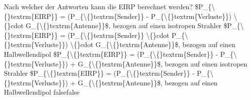     {Nach welcher der Antworten kann die EIRP berechnet werden?}
    {\$P\_\{\textbackslash\{\}textrm\{EIRP\}\} = (P\_\{\textbackslash\{\}textrm\{Sender\}\} - P\_\{\textbackslash\{\}textrm\{Verluste\}\}) \textbackslash\{\}cdot G\_\{\textbackslash\{\}textrm\{Antenne\}\}\$, bezogen auf einen isotropen Strahler}
    {\$P\_\{\textbackslash\{\}textrm\{EIRP\}\} = (P\_\{\textbackslash\{\}textrm\{Sender\}\} \textbackslash\{\}cdot P\_\{\textbackslash\{\}textrm\{Verluste\}\}) \textbackslash\{\}cdot G\_\{\textbackslash\{\}textrm\{Antenne\}\}\$, bezogen auf einen Halbwellendipol}
    {\$P\_\{\textbackslash\{\}textrm\{EIRP\}\} = (P\_\{\textbackslash\{\}textrm\{Sender\}\} - P\_\{\textbackslash\{\}textrm\{Verluste\}\}) + G\_\{\textbackslash\{\}textrm\{Antenne\}\}\$, bezogen auf einen isotropen Strahler}
    {\$P\_\{\textbackslash\{\}textrm\{EIRP\}\} = (P\_\{\textbackslash\{\}textrm\{Sender\}\} - P\_\{\textbackslash\{\}textrm\{Verluste\}\}) + G\_\{\textbackslash\{\}textrm\{Antenne\}\}\$, bezogen auf einen Halbwellendipol}
    {false}{false}